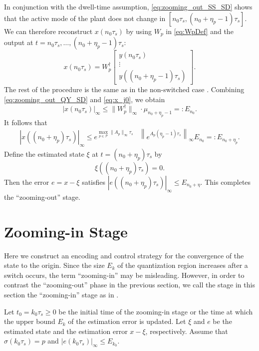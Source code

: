 \documentclass[letterpaper, 11pt, onecolumn]{ieeeconf}  \IEEEoverridecommandlockouts
\begin{document}
In conjunction with the dwell-time assumption, 
\eqref{eq:zooming_out_SS_SD} shows that
the active mode of the plant does not change in 
$[n_0\tau_s, (n_0 + \eta_p -1)\tau_s]$.
We can therefore reconstruct $x(n_0\tau_s)$ by using
$W_p$ in \eqref{eq:WpDef} and the output at 
$t = n_0\tau_s,\dots , (n_0 + \eta_p -1)\tau_s$:
\begin{equation}
\label{eq:x_j0}
x(n_0\tau_s) = W_p^{\dagger}
\begin{bmatrix}
y(n_0\tau_s) \\
\vdots \\
y((n_0 + \eta_p - 1)\tau_s)
\end{bmatrix}.
\end{equation}
The rest of the procedure is the same as in the non-switched 
case \cite{Liberzon2003}.
Combining
\eqref{eq:zooming_out_QY_SD} and \eqref{eq:x_j0}, 
we obtain
\begin{equation}
\label{eq:En0_def}
|x(n_0 \tau_s)|_{\infty} \leq  \|W_p^{\dagger}\|_{\infty}\cdot
\mu_{n_0+\eta_p - 1} =: E_{n_0}.
\end{equation}
It follows that
\begin{align}
|x((n_0 + \eta_p)\tau_s)|_{\infty} 
\leq 
e^{\max_{p \in \mathcal{P}} \|A_p\|_{\infty} \tau_s} 
&\left\|
e^{A_p(\eta_p - 1)\tau_s}
\right\|_{\infty} 
E_{n_0} 
=: E_{n_0+\eta_p}.
\label{eq:En0+etap}
\end{align}
Define the estimated state $\xi$ at $t =(n_0+\eta_p)\tau_s$ by
\begin{equation}
\label{eq:ES_Initial}
\xi((n_0+\eta_p)\tau_s) = 0.
\end{equation}
Then the error $e=x -\xi$ satisfies
$
|e((n_0+\eta_p)\tau_s)|_{\infty} \leq E_{n_0+\eta }.
$
This completes the ``zooming-out'' stage.



\section{Zooming-in Stage}
Here we construct an encoding and control strategy for the
convergence of the state to the origin.
Since the size $E_k$ of the quantization region increases
after a switch occurs, the term ``zooming-in'' may be misleading.
However, in order to contrast the ``zooming-out'' phase in the
previous section, 
we call the stage in this section the ``zooming-in'' stage as in
\cite{Liberzon2003Automatica,Brockett2000}.

Let $t_0=k_0\tau_s \geq 0$ be the initial time of the zooming-in stage
or the time at which the upper bound $E_k$ of the estimation error is updated. 
Let $\xi$ and $e$ be the estimated state and the estimation error $x - \xi$,
respectively.
Assume that $\sigma(k_0\tau_s) = p$ and 
$|e(k_0\tau_s)|_{\infty} \leq E_{k_0}$.
\end{document}
